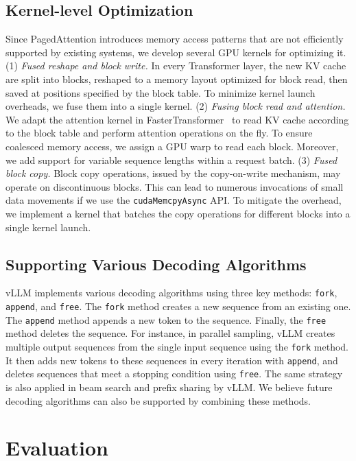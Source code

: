 \subsection{Kernel-level Optimization}
\label{sec:impl-kernel}

Since PagedAttention introduces memory access patterns that are not efficiently supported by existing systems, we develop several GPU kernels for optimizing it. (1) \emph{Fused reshape and block write.} In every Transformer layer, the new KV cache are split into blocks, reshaped to a memory layout optimized for block read, then saved at positions specified by the block table. To minimize kernel launch overheads, we fuse them into a single kernel. (2) \emph{Fusing block read and attention.} We adapt the attention kernel in FasterTransformer~\cite{nvidiaft} to read KV cache according to the block table and perform attention operations on the fly. To ensure coalesced memory access, we assign a GPU warp to read each block. Moreover, we add support for variable sequence lengths within a request batch. (3) \emph{Fused block copy.} Block copy operations, issued by the copy-on-write mechanism, may operate on discontinuous blocks. This can lead to numerous invocations of small data movements if we use the \texttt{cudaMemcpyAsync} API. To mitigate the overhead, we implement a kernel that batches the copy operations for different blocks into a single kernel launch.

\subsection{Supporting Various Decoding Algorithms}

vLLM implements various decoding algorithms using three key methods: \texttt{fork}, \texttt{append}, and \texttt{free}.
The \texttt{fork} method creates a new sequence from an existing one. The \texttt{append} method appends a new token to the sequence. Finally, the \texttt{free} method deletes the sequence. For instance, in parallel sampling, vLLM creates multiple output sequences from the single input sequence using the \texttt{fork} method. It then adds new tokens to these sequences in every iteration with \texttt{append}, and deletes sequences that meet a stopping condition using \texttt{free}.
The same strategy is also applied in beam search and prefix sharing by vLLM. We believe future decoding algorithms can also be supported by combining these methods.

\section{Evaluation}
\label{sec:eval}

